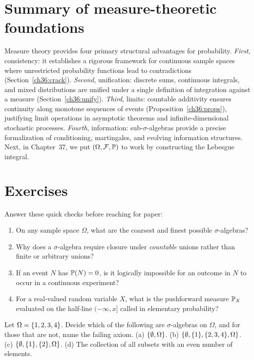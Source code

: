 \section{Summary of measure-theoretic foundations}
\label{ch36:payoff}

Measure theory provides four primary structural advantages for probability.
\emph{First}, consistency: it establishes a rigorous framework for continuous sample
spaces where unrestricted probability functions lead to contradictions (Section~\ref{ch36:crack}).
\emph{Second}, unification: discrete sums, continuous integrals, and mixed distributions
are unified under a single definition of integration against a measure (Section~\ref{ch36:unify}).
\emph{Third}, limits: countable additivity ensures continuity along monotone sequences of events
(Proposition~\ref{ch36:props}), justifying limit operations in asymptotic theorems and
infinite-dimensional stochastic processes.
\emph{Fourth}, information: sub-$\sigma$-algebras provide a precise formalization of
conditioning, martingales, and evolving information structures.
Next, in Chapter~37, we put $(\Omega, \mathcal{F}, \P)$ to work by constructing the Lebesgue integral.

\section{Exercises}
\label{ch36:exercises}

\begin{exercise}
\label{ch36:ex-warmup}
Answer these quick checks before reaching for paper:
\begin{enumerate}[label=(\alph*)]
  \item On any sample space $\Omega$, what are the coarsest and finest possible $\sigma$-algebras?
  \item Why does a $\sigma$-algebra require closure under \emph{countable} unions rather than finite or arbitrary unions?
  \item If an event $N$ has $\P(N) = 0$, is it logically impossible for an outcome in $N$ to occur in a continuous experiment?
  \item For a real-valued random variable $X$, what is the pushforward measure $\P_X$ evaluated on the half-line $(-\infty, x]$ called in elementary probability?
\end{enumerate}
\end{exercise}

\begin{exercise}
\label{ch36:ex-axioms}
Let $\Omega = \set{1,2,3,4}$. Decide which of the following are
$\sigma$-algebras on $\Omega$, and for those that are not, name the failing axiom.
(a) $\set{\emptyset, \Omega}$.
(b) $\set{\emptyset, \set{1}, \set{2,3,4}, \Omega}$.
(c) $\set{\emptyset, \set{1}, \set{2}, \Omega}$.
(d) The collection of all subsets with an even number of elements.
\end{exercise}

